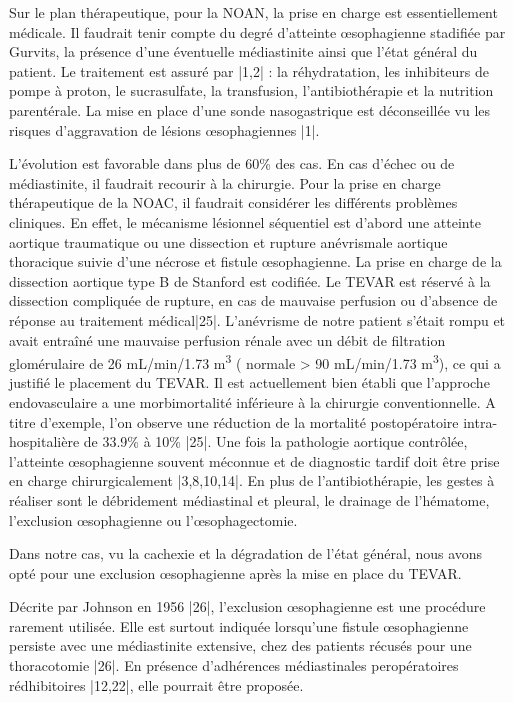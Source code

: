 \documentclass[./tfe.tex]{subfiles}
\begin{document}
Sur le plan thérapeutique, pour la NOAN, la prise en charge est essentiellement médicale. Il faudrait tenir compte du degré d’atteinte œsophagienne stadifiée par Gurvits, la présence d’une éventuelle médiastinite ainsi que l’état général du patient. Le traitement est assuré par |1,2| : la réhydratation, les inhibiteurs de pompe à proton, le sucrasulfate, la transfusion, l’antibiothérapie et la nutrition parentérale. La mise en place d’une sonde nasogastrique est déconseillée vu les risques d’aggravation de lésions œsophagiennes |1|.

L’évolution est favorable dans plus de 60\% des cas. En cas d’échec ou de médiastinite, il faudrait recourir à la chirurgie.
Pour la prise en charge thérapeutique de la NOAC, il faudrait considérer les différents problèmes cliniques. En effet, le mécanisme lésionnel séquentiel est d’abord une atteinte aortique traumatique ou une dissection et rupture anévrismale aortique thoracique suivie d’une nécrose et fistule œsophagienne.
La prise en charge de la dissection aortique type B de Stanford est codifiée. Le TEVAR est réservé à la dissection compliquée de rupture, en cas de mauvaise perfusion ou d’absence de réponse au traitement médical|25|. L’anévrisme de notre patient s’était rompu et avait entraîné une mauvaise perfusion rénale avec un débit de filtration glomérulaire de 26 mL/min/1.73 \si{\cubic\meter} ( normale > 90 mL/min/1.73 \si{\cubic\meter}), ce qui a justifié le placement du TEVAR. Il est actuellement bien établi que l’approche endovasculaire a une morbimortalité inférieure à la chirurgie conventionnelle. A titre d’exemple, l’on observe une réduction de la mortalité postopératoire intra-hospitalière de 33.9\% à 10\% |25|. 
Une fois la pathologie aortique contrôlée, l’atteinte œsophagienne souvent méconnue et de diagnostic tardif doit être prise en charge chirurgicalement |3,8,10,14|. En plus de l’antibiothérapie, les gestes à réaliser sont le débridement médiastinal et pleural, le drainage de l’hématome, l’exclusion œsophagienne ou l’œsophagectomie.

Dans notre cas, vu la cachexie et la dégradation de l’état général, nous avons opté pour une exclusion œsophagienne après la mise en place du TEVAR.

Décrite par Johnson en 1956 |26|, l’exclusion œsophagienne est une procédure rarement utilisée. Elle est surtout indiquée lorsqu’une fistule œsophagienne persiste avec une médiastinite extensive, chez des patients récusés pour une thoracotomie |26|. En présence d’adhérences médiastinales peropératoires rédhibitoires |12,22|, elle pourrait être proposée.
\end{document}
